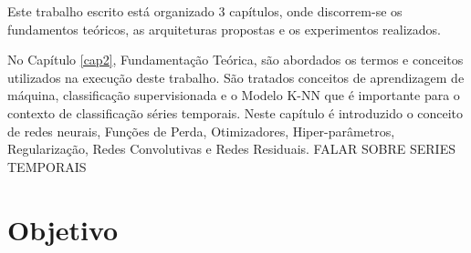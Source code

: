 Este trabalho escrito está organizado 3 capítulos, onde discorrem-se os fundamentos teóricos, as arquiteturas propostas e os experimentos realizados.

No Capítulo \ref{cap2}, Fundamentação Teórica, são abordados os termos e conceitos utilizados na execução deste trabalho. São tratados conceitos de aprendizagem de máquina, classificação supervisionada e o Modelo K-NN que é importante para o contexto de classificação séries temporais. Neste capítulo é introduzido o conceito de redes neurais, Funções de Perda, Otimizadores, Hiper-parâmetros, Regularização, Redes Convolutivas e Redes Residuais. FALAR SOBRE SERIES TEMPORAIS





\section{Objetivo}

